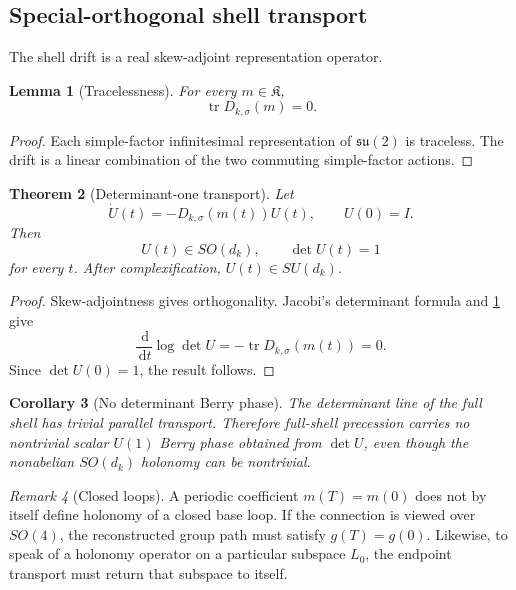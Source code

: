 \documentclass[
 aps,
 prd,
 reprint,
 amsmath,
 amssymb,
 nofootinbib,
 superscriptaddress
]{revtex4-2}
\newtheorem{theorem}{Theorem}[section]
\newtheorem{lemma}[theorem]{Lemma}
\newtheorem{corollary}[theorem]{Corollary}
\theoremstyle{definition}
\theoremstyle{remark}
\newtheorem{remark}[theorem]{Remark}
\newcommand{\cK}{\mathfrak K}
\newcommand{\dd}{\,\mathrm d}
\newcommand{\tr}{\operatorname{tr}}
\begin{document}
\subsection{Special-orthogonal shell transport}

The shell drift is a real skew-adjoint representation operator.

\begin{lemma}[Tracelessness]
\label{G:pr:lem:traceless}
For every \(m\in\cK\),
\begin{equation}
 \boxed{\tr D_{k,\sigma}(m)=0.}
 \label{G:pr:eq:traceless}
\end{equation}
\end{lemma}

\begin{proof}
Each simple-factor infinitesimal representation of
\(\mathfrak{su}(2)\) is traceless.  The drift is a linear combination of the
two commuting simple-factor actions.
\end{proof}

\begin{theorem}[Determinant-one transport]
\label{G:pr:thm:detone}
Let
\[
 \dot U(t)=-D_{k,\sigma}(m(t))U(t),
 \qquad U(0)=I.
\]
Then
\begin{equation}
 \boxed{
 U(t)\in SO(d_k),
 \qquad
 \det U(t)=1
 }
 \label{G:pr:eq:detone}
\end{equation}
for every \(t\).  After complexification,
\(U(t)\in SU(d_k)\).
\end{theorem}

\begin{proof}
Skew-adjointness gives orthogonality.  Jacobi's determinant formula and
\cref{G:pr:lem:traceless} give
\[
 \frac{\dd}{\dd t}\log\det U
 =
 -\tr D_{k,\sigma}(m(t))
 =
 0.
\]
Since \(\det U(0)=1\), the result follows.
\end{proof}

\begin{corollary}[No determinant Berry phase]
\label{G:pr:cor:nouone}
The determinant line of the full shell has trivial parallel transport.
Therefore full-shell precession carries no nontrivial scalar \(U(1)\)
Berry phase obtained from \(\det U\), even though the nonabelian
\(SO(d_k)\) holonomy can be nontrivial.
\end{corollary}

\begin{remark}[Closed loops]
A periodic coefficient \(m(T)=m(0)\) does not by itself define holonomy of a
closed base loop.  If the connection is viewed over \(SO(4)\), the
reconstructed group path must satisfy \(g(T)=g(0)\).  Likewise, to speak of
a holonomy operator on a particular subspace \(L_0\), the endpoint transport
must return that subspace to itself.
\end{remark}
\end{document}
